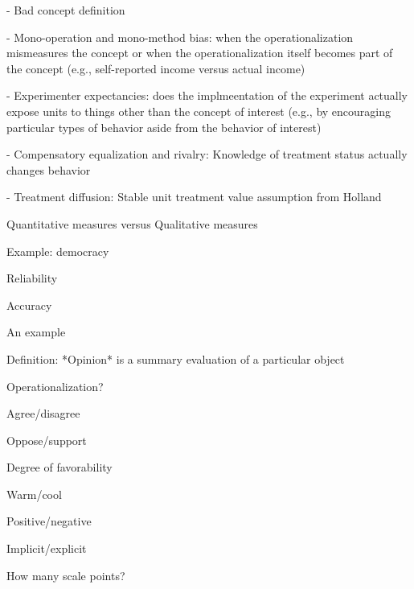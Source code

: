 - Bad concept definition

- Mono-operation and mono-method bias: when the operationalization mismeasures the concept or when the operationalization itself becomes part of the concept (e.g., self-reported income versus actual income)

- Experimenter expectancies: does the implmeentation of the experiment actually expose units to things other than the concept of interest (e.g., by encouraging particular types of behavior aside from the behavior of interest)

- Compensatory equalization and rivalry: Knowledge of treatment status actually changes behavior

- Treatment diffusion: Stable unit treatment value assumption from Holland



Quantitative measures versus Qualitative measures

Example: democracy




Reliability

Accuracy





An example

Definition: *Opinion* is a summary evaluation of a particular object

Operationalization?


Agree/disagree

Oppose/support

Degree of favorability

Warm/cool

Positive/negative

Implicit/explicit

How many scale points?



\appendix
\frame{}


